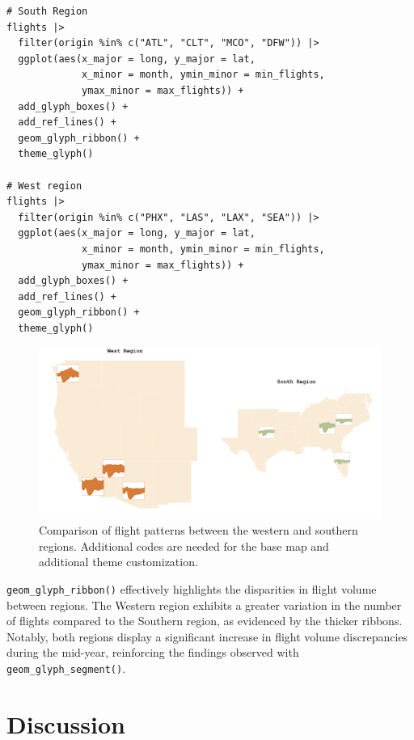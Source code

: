 \begin{verbatim}
# South Region
flights |> 
  filter(origin %in% c("ATL", "CLT", "MCO", "DFW")) |>
  ggplot(aes(x_major = long, y_major = lat,
             x_minor = month, ymin_minor = min_flights,
             ymax_minor = max_flights)) + 
  add_glyph_boxes() +
  add_ref_lines() +
  geom_glyph_ribbon() +
  theme_glyph()

# West region
flights |> 
  filter(origin %in% c("PHX", "LAS", "LAX", "SEA")) |>
  ggplot(aes(x_major = long, y_major = lat,
             x_minor = month, ymin_minor = min_flights,
             ymax_minor = max_flights)) + 
  add_glyph_boxes() +
  add_ref_lines() +
  geom_glyph_ribbon() +
  theme_glyph()
\end{verbatim}

\begin{figure}
\includegraphics[width=50in]{figures/west_south} \caption{Comparison of flight patterns between the western and southern regions. Additional codes are needed for the base map and additional theme customization.}\label{fig:unnamed-chunk-27}
\end{figure}

\texttt{geom\_glyph\_ribbon()} effectively highlights the disparities in flight volume between regions. The Western region exhibits a greater variation in the number of flights compared to the Southern region, as evidenced by the thicker ribbons. Notably, both regions display a significant increase in flight volume discrepancies during the mid-year, reinforcing the findings observed with \texttt{geom\_glyph\_segment()}.

\hypertarget{discussion}{%
\section{Discussion}\label{discussion}}

